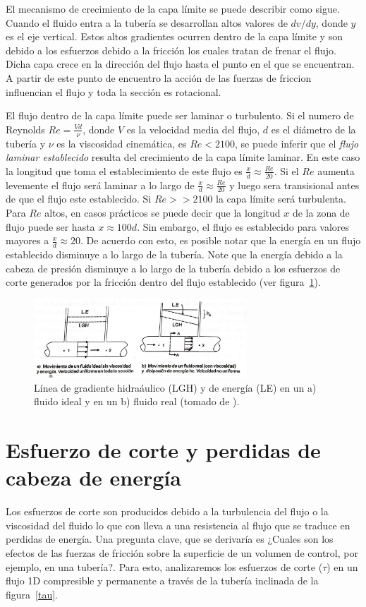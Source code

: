 \documentclass[11pt, oneside]{article}
\begin{document}
El mecanismo de crecimiento de la capa l\'imite se puede describir como sigue. Cuando el fluido entra a la tuber\'ia se desarrollan altos valores de $dv/dy$, donde $y$ es el eje vertical. Estos altos gradientes ocurren dentro de la capa l\'imite y son debido a los esfuerzos debido a la fricci\'on los cuales tratan de frenar el flujo. Dicha capa crece en la direcci\'on del flujo hasta el punto en el que se encuentran. A partir de este punto de encuentro la acci\'on de las fuerzas de friccion influencian el flujo y toda la secci\'on es rotacional.

El flujo dentro de la capa l\'imite puede ser laminar o turbulento. Si el numero de Reynolds $Re = \frac{Vd}{\nu}$, donde $V$ es la velocidad media del flujo, $d$ es el di\'ametro de la tuber\'ia y $\nu$ es la viscosidad cinem\'atica, es $Re < 2100$, se puede inferir que el \emph{flujo laminar establecido} resulta del crecimiento de la capa l\'imite laminar. En este caso la longitud que toma el establecimiento de este flujo es $\frac{x}{d} \approx \frac{Re}{20}$. Si el $Re$ aumenta levemente el flujo ser\'a laminar a lo largo de $\frac{x}{d} \approx \frac{Re}{20}$ y luego sera transisional antes de que el flujo este establecido. Si $Re >> 2100$ la capa l\'imite ser\'a turbulenta. Para $Re$ altos, en casos pr\'acticos se puede decir que la longitud $x$ de la zona de flujo puede ser hasta $x \approx 100 d$. Sin embargo, el flujo es establecido para valores mayores a $\frac{x}{d} \approx 20$. De acuerdo con esto, es posible notar que la energ\'ia en un flujo establecido disminuye a lo largo de la tuber\'ia. Note que la energ\'ia debido a la cabeza de presi\'on disminuye a lo largo de la tuber\'ia debido a los esfuerzos de corte generados por la fricci\'on dentro del flujo establecido (ver figura~\ref{fifr}). 
  
\begin{figure}[h]
\centering
\includegraphics[width=8cm]{fifr.jpeg}
\caption{L\'inea de gradiente hidra\'aulico (LGH) y de energ\'ia (LE) en un a) fluido ideal y en un b) fluido real (tomado de \cite{agudelo2011mecanica}).}
\label{fifr}
\end{figure}

\section{Esfuerzo de corte y perdidas de cabeza de energ\'ia} %
Los esfuerzos de corte son producidos debido a la turbulencia del flujo o la viscosidad del fluido lo que con lleva a una resistencia al flujo que se traduce en perdidas de energ\'ia. Una pregunta clave, que se derivar\'ia es ¿Cuales son los efectos de las fuerzas de fricci\'on sobre la superficie de un volumen de control, por ejemplo,  en una tuber\'ia?. Para esto, analizaremos los esfuerzos de corte ($\tau$) en un  flujo 1D compresible y permanente a trav\'es de la tuber\'ia inclinada de la figura~\ref{tau}.
   
\end{document}
